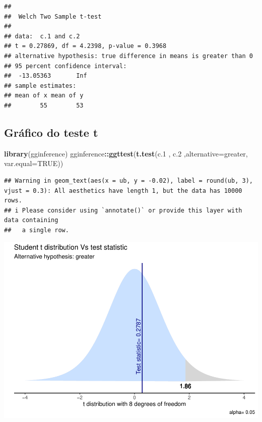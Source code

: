 \documentclass[
]{book}
\newenvironment{Shaded}{\begin{snugshade}}{\end{snugshade}}
\newcommand{\AttributeTok}[1]{\textcolor[rgb]{0.13,0.29,0.53}{#1}}
\newcommand{\ConstantTok}[1]{\textcolor[rgb]{0.56,0.35,0.01}{#1}}
\newcommand{\FloatTok}[1]{\textcolor[rgb]{0.00,0.00,0.81}{#1}}
\newcommand{\FunctionTok}[1]{\textcolor[rgb]{0.13,0.29,0.53}{\textbf{#1}}}
\newcommand{\NormalTok}[1]{#1}
\newcommand{\SpecialCharTok}[1]{\textcolor[rgb]{0.81,0.36,0.00}{\textbf{#1}}}
\newcommand{\StringTok}[1]{\textcolor[rgb]{0.31,0.60,0.02}{#1}}
\begin{document}
\begin{verbatim}
## 
##  Welch Two Sample t-test
## 
## data:  c.1 and c.2
## t = 0.27869, df = 4.2398, p-value = 0.3968
## alternative hypothesis: true difference in means is greater than 0
## 95 percent confidence interval:
##  -13.05363       Inf
## sample estimates:
## mean of x mean of y 
##        55        53
\end{verbatim}

\subsection{Gráfico do teste t}\label{gruxe1fico-do-teste-t-1}

\begin{Shaded}
\begin{Highlighting}[]
\FunctionTok{library}\NormalTok{(gginference)}
\NormalTok{gginference}\SpecialCharTok{::}\FunctionTok{ggttest}\NormalTok{(}\FunctionTok{t.test}\NormalTok{(c}\FloatTok{.1}\NormalTok{ , c}\FloatTok{.2}\NormalTok{ ,}\AttributeTok{alternative=}\StringTok{\textquotesingle{}greater\textquotesingle{}}\NormalTok{, }\AttributeTok{var.equal=}\ConstantTok{TRUE}\NormalTok{))}
\end{Highlighting}
\end{Shaded}

\begin{verbatim}
## Warning in geom_text(aes(x = ub, y = -0.02), label = round(ub, 3), vjust = 0.3): All aesthetics have length 1, but the data has 10000 rows.
## i Please consider using `annotate()` or provide this layer with data containing
##   a single row.
\end{verbatim}

\includegraphics{_main_files/figure-latex/graf1-1.pdf}
\end{document}
